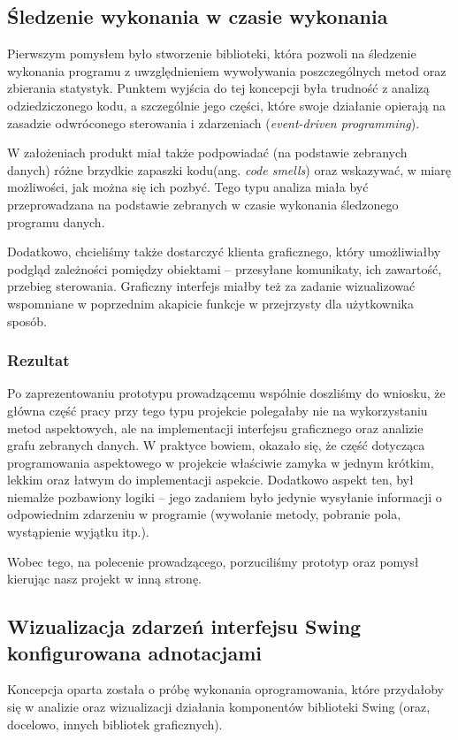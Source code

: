 \documentclass[12pt,a4paper,titlepage]{article}
\begin{document}
 \subsection{Śledzenie wykonania w czasie wykonania}
  Pierwszym pomysłem było stworzenie biblioteki, która pozwoli na śledzenie wykonania programu z uwzględnieniem wywoływania poszczególnych metod oraz zbierania statystyk. Punktem wyjścia do tej koncepcji była trudność z analizą odziedziczonego kodu, a szczególnie jego części, które swoje działanie opierają na zasadzie odwróconego sterowania i zdarzeniach (\emph{event-driven programming}).
  
  W założeniach produkt miał także podpowiadać (na podstawie zebranych danych) różne brzydkie zapaszki kodu(ang. \textit{code smells}) oraz wskazywać, w miarę możliwości, jak można się ich pozbyć. Tego typu analiza miała być przeprowadzana na podstawie zebranych w czasie wykonania śledzonego programu danych.
  
  Dodatkowo, chcieliśmy także dostarczyć klienta graficznego, który umożliwiałby podgląd zależności pomiędzy obiektami -- przesyłane komunikaty, ich zawartość, przebieg sterowania. Graficzny interfejs miałby też za zadanie wizualizować wspomniane w poprzednim akapicie funkcje w przejrzysty dla użytkownika sposób.
  \subsubsection*{Rezultat}
   Po zaprezentowaniu prototypu prowadzącemu wspólnie doszliśmy do wniosku, że główna część pracy przy tego typu projekcie polegałaby nie na wykorzystaniu metod aspektowych, ale na implementacji interfejsu graficznego oraz analizie grafu zebranych danych. W praktyce bowiem, okazało się, że część dotycząca programowania aspektowego w projekcie właściwie zamyka w jednym krótkim, lekkim oraz łatwym do implementacji aspekcie. Dodatkowo aspekt ten, był niemalże pozbawiony logiki -- jego zadaniem było jedynie wysyłanie informacji o odpowiednim zdarzeniu w programie (wywołanie metody, pobranie pola, wystąpienie wyjątku itp.). 
   
   Wobec tego, na polecenie prowadzącego, porzuciliśmy prototyp oraz pomysł kierując nasz projekt w inną stronę. 
   
 \subsection{Wizualizacja zdarzeń interfejsu Swing konfigurowana adnotacjami}
 Koncepcja oparta została o próbę wykonania oprogramowania, które przydałoby się w analizie oraz wizualizacji działania komponentów biblioteki Swing (oraz, docelowo, innych bibliotek graficznych).
 
\end{document}
